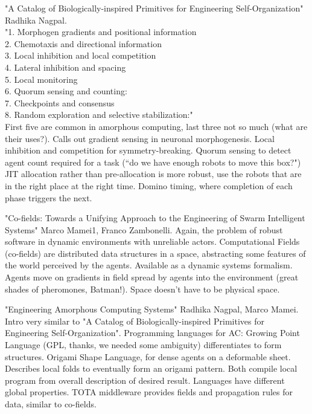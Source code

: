 \documentclass[]{article}
\begin{document}
"A Catalog of Biologically-inspired Primitives for Engineering Self-Organization" \cite{nagpal2004catalog} Radhika Nagpal.\\ 
"1. Morphogen gradients and positional information \\
2. Chemotaxis and directional information \\
3. Local inhibition and local competition \\
4. Lateral inhibition and spacing \\
5. Local monitoring \\
6. Quorum sensing and counting: \\
7. Checkpoints and consensus \\
8. Random exploration and selective stabilization:"\\
First five are common in amorphous computing, last three not so much (what are their uses?). Calls out gradient sensing in neuronal morphogenesis. Local inhibition and competition for symmetry-breaking. Quorum sensing to detect agent count required for a task (``do we have enough robots to move this box?") JIT allocation rather than pre-allocation is more robust, use the robots that are in the right place at the right time. Domino timing, where completion of each phase triggers the next. 

"Co-fields: Towards a Unifying Approach to the Engineering of Swarm Intelligent Systems" \cite{mamei2003co} Marco Mamei1, Franco Zambonelli. Again, the problem of robust software in dynamic environments with unreliable actors. Computational Fields (co-fields) are distributed data structures in a space, abstracting some features of the world perceived by the agents. Available as a dynamic systems formalism. Agents move on gradients in field spread by agents into the environment (great shades of pheromones, Batman!). Space doesn't have to be physical space. 

"Engineering Amorphous Computing Systems" \cite{nagpal2004engineering} Radhika Nagpal, Marco Mamei. Intro very similar to "A Catalog of Biologically-inspired Primitives for Engineering Self-Organization". Programming languages for AC: Growing Point Language (GPL, thanks, we needed some ambiguity) differentiates to form structures. Origami Shape Language, for dense agents on a deformable sheet. Describes local folds to eventually form an origami pattern. Both compile local program from overall description of desired result. Languages have different global properties. TOTA middleware provides fields and propagation rules for data, similar to co-fields. 
\end{document}
